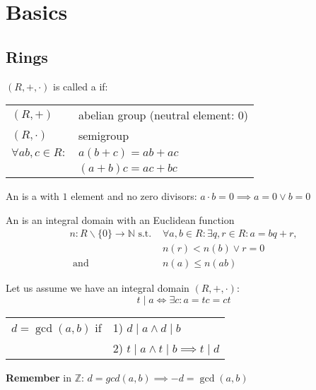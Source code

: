
\section{Basics}

\subsection{Rings}
\begin{definition}
$(R,+,\cdot)$ is called a  if:

\begin{center}
\begin{tabular}{ll}
  $(R,+)$ & abelian group (neutral element: 0)\\
  $(R,\cdot)$ & semigroup \\
  $\forall ab,c \in R:$ & $a(b+c) = ab+ac$\\
                        & $(a+b)c = ac+bc$\\
\end{tabular}
\end{center}
\end{definition}

\begin{definition}
An  is a  with $1$ element and no zero divisors: $a\cdot b = 0 \implies a=0 \lor b = 0$
\end{definition}

\begin{definition}
An  is an integral domain with an Euclidean function
\begin{align*}
  n: R \backslash \{0\} \rightarrow \mathbb{N} \text{ s.t. } &\forall a,b \in R: \exists q,r \in R: a = bq + r, \\
  &n(r) < n(b) \lor r=0 \\
  \text{ and } &n(a) \leq n(ab)
\end{align*}
\end{definition}

Let us assume we have an integral domain $(R,+, \cdot)$:\\
\[ t∣a \Leftrightarrow \exists c: a=tc =ct \]
\begin{center}
\begin{tabular}{ll}
$d=\gcd(a,b)$ if & 1) $d∣a \land d∣b$ \\
  & 2) $t∣a \land t∣b \implies t∣d$
\end{tabular}
\end{center}

\textbf{Remember}
in $\mathbb{Z}$: $d = gcd(a,b) \implies -d = \gcd(a,b)$

